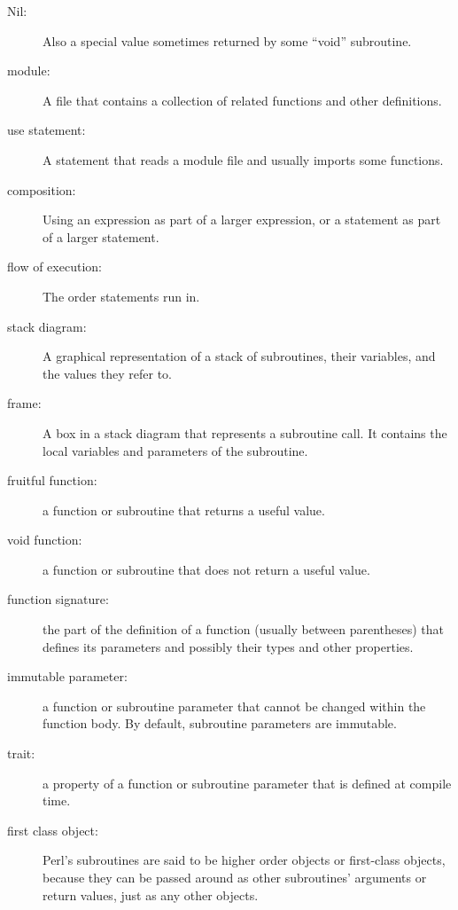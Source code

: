 \begin{description}
\item[Nil:] Also a special value sometimes returned by some 
``void'' subroutine.

\item[module:] A file that contains a
collection of related functions and other definitions.

\item[use statement:] A statement that reads a module file and usually imports some functions.

\item[composition:] Using an expression as part of a larger expression,
or a statement as part of a larger statement.

\item[flow of execution:]  The order statements run in.

\item[stack diagram:]  A graphical representation of a stack of subroutines,
their variables, and the values they refer to.

\item[frame:]  A box in a stack diagram that represents a subroutine call.
It contains the local variables and parameters of the subroutine.

\item[fruitful function:] a function or subroutine that returns a useful value.

\item[void function:] a function or subroutine that does not 
return a useful value.

\item[function signature:] the part of the definition of a 
function (usually between parentheses) that defines its 
parameters and possibly their types and other properties.

\item[immutable parameter:] a function or subroutine parameter 
that cannot be changed within the function body. By default, 
subroutine parameters are immutable.

\item[trait:] a property of a function or subroutine parameter 
that is defined at compile time.

\item[first class object:] Perl's subroutines are said to be
higher order objects or first-class objects, because they can 
be passed around as other subroutines' arguments or return values, 
just as any other objects.


\end{description}
